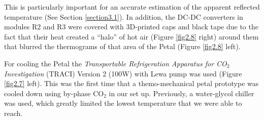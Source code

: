 		This is particularly important for an accurate estimation of the apparent reflected temperature (See Section \ref{section3.1}). In addition, the DC-DC converters in modules R2 and R3 were covered with 3D-printed caps and black tape due to the fact that their heat created a “halo” of hot air (Figure \ref{fig2.8} right) around them that blurred the thermograms of that area of the Petal (Figure \ref{fig2.8} left).
		
		For cooling the Petal the \textit{Transportable Refrigeration Apparatus for CO$_{2}$ Investigation} (TRACI) Version 2 (100W) with Lewa pump was used (Figure \ref{fig2.7} left). This was the first time that a themo-mechanical petal prototype was cooled down using by-phase CO$_{2}$ in our set up. Previously, a water-glycol chiller was used, which greatly limited the lowest temperature that we were able to reach.
	
